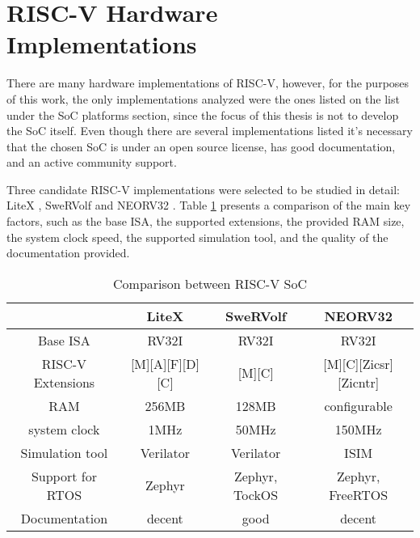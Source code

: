 %
\section{RISC-V Hardware Implementations}
There are many hardware implementations of RISC-V, however, for the purposes of this work, the only implementations analyzed were the ones listed on the list \cite{RISCV_list} under the SoC platforms section, since the focus of this thesis is not to develop the SoC itself. Even though there are several implementations listed it's necessary that the chosen SoC is under an open source license, has good documentation, and an active community support.

Three candidate RISC-V implementations were selected to be studied in detail: LiteX \cite{LiteX}, SweRVolf \cite{SweRVolf} and NEORV32 \cite{NEORV32}. Table \ref{tab:comparação RISC} presents a comparison of the main key factors, such as the base ISA, the supported extensions, the provided RAM size, the system clock speed, the supported simulation tool, and the quality of the documentation provided.

\begin{table}[H]
    \centering
    \begin{tabular}{ c | c | c | c }
         & LiteX & SweRVolf & NEORV32\\
        \hline
        Base ISA & RV32I & RV32I & RV32I\\
        RISC-V Extensions & [M][A][F][D][C] & [M][C] & [M][C][Zicsr][Zicntr]\\ 
        \hline
        RAM & 256MB & 128MB & configurable\\
        system clock & 1MHz & 50MHz & 150MHz\\
        \hline
        Simulation tool & Verilator & Verilator & ISIM\\
        \hline
        Support for RTOS & Zephyr & Zephyr, TockOS & Zephyr, FreeRTOS\\
        \hline
        Documentation & decent & good & decent\\
    \end{tabular}
    \label{tab:comparação RISC}
    \caption{Comparison between RISC-V SoC}
\end{table}

